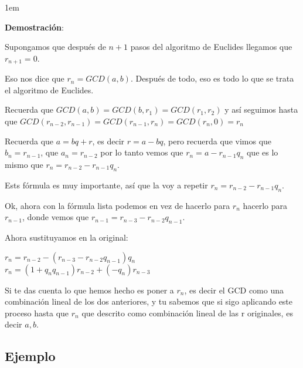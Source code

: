 \documentclass[12pt]{report}                                    %
\newenvironment{SmallIndentation}[1][0.75em]                    %
    {\begin{adjustwidth}{#1}{}\begin{footnotesize}}                 %
    {\end{footnotesize}\end{adjustwidth}}                           %
\begin{document}
            \begin{SmallIndentation}[1em]
                \textbf{Demostración}:

                Supongamos que después de $n+1$ pasos del algoritmo de Euclides llegamos que
                $r_{n+1}=0$.

                Eso nos dice que $r_n=GCD(a,b)$. Después de todo, eso es todo lo que se
                trata el algoritmo de Euclides.

                Recuerda que $GCD(a,b) = GCD(b,r_1) = GCD(r_1,r_2)$ y así seguimos hasta que
                $GCD(r_{n-2},r_{n-1}) = GCD(r_{n-1},r_n) = GCD(r_n,0) = r_n$

                Recuerda que $a=bq+r$, es decir $r=a-bq$, pero recuerda que vimos que
                $b_n = r_{n-1}$, que $a_n=r_{n-2}$ por lo tanto vemos que
                $r_n=a-r_{n-1}q_n$ que es lo mismo que  $r_n = r_{n-2} - r_{n-1}q_n$.

                Ests fórmula es muy importante, así que la voy a repetir $r_n = r_{n-2} - r_{n-1}q_n$.

                Ok, ahora con la fórmula lista podemos en vez de hacerlo para $r_n$ hacerlo para
                $r_{n-1}$, donde vemos que $r_{n-1} = r_{n-3} - r_{n-2}q_{n-1}$.

                Ahora sustituyamos en la original:

                $r_n = r_{n-2} - (r_{n-3} - r_{n-2}q_{n-1})q_n$\\
                $r_n = (1+q_n q_{n-1})r_{n-2} + (-q_n)r_{n-3}$

                Si te das cuenta lo que hemos hecho es poner a $r_n$, es decir el GCD como
                una combinación lineal de los dos anteriores, y tu sabemos que si sigo
                aplicando este proceso hasta que $r_n$ que descrito como combinación 
                lineal de las r originales, es decir $a,b$.

            \end{SmallIndentation}






        \clearpage
        \subsection{Ejemplo}
\end{document}
